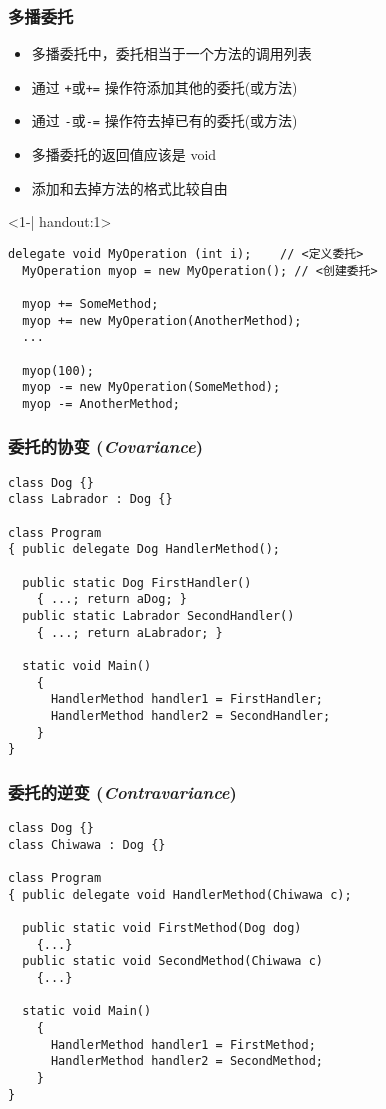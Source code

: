 \begin{frame}[fragile]
\frametitle{多播委托}
\begin{itemize}
\setlength{\itemsep}{4pt plus 1pt}
\item<1-| handout:1> 多播委托中，委托相当于一个方法的调用列表
\item<2-| handout:1> 通过 \texttt{+}或\texttt{+=} 操作符添加其他的委托(或方法)
\item<2-| handout:1> 通过 \texttt{-}或\texttt{-=} 操作符去掉已有的委托(或方法)
\item<3-| handout:1> 多播委托的返回值应该是 void
\item<3-| handout:1> 添加和去掉方法的格式比较自由
\end{itemize}
\begin{onlyenv}<1-| handout:1>
\begin{lstlisting}[escapeinside=<>]
  delegate void MyOperation (int i);    // <定义委托>
  MyOperation myop = new MyOperation(); // <创建委托>

  myop += SomeMethod;
  myop += new MyOperation(AnotherMethod);
  ...

  myop(100);
  myop -= new MyOperation(SomeMethod);
  myop -= AnotherMethod;

\end{lstlisting}
\end{onlyenv}
\end{frame}

\begin{frame}[fragile]
\frametitle{委托的协变 (\textit{Covariance})}
\begin{lstlisting}
class Dog {}
class Labrador : Dog {}

class Program
{ public delegate Dog HandlerMethod();

  public static Dog FirstHandler()  
    { ...; return aDog; }
  public static Labrador SecondHandler()
    { ...; return aLabrador; }

  static void Main() 
    {
      HandlerMethod handler1 = FirstHandler;
      HandlerMethod handler2 = SecondHandler;
    }
}
\end{lstlisting}
\end{frame}

\begin{frame}[fragile]
\frametitle{委托的逆变 (\textit{Contravariance})}
\begin{lstlisting}
class Dog {}
class Chiwawa : Dog {}
 
class Program
{ public delegate void HandlerMethod(Chiwawa c);
 
  public static void FirstMethod(Dog dog)
    {...}
  public static void SecondMethod(Chiwawa c)
    {...}
 
  static void Main()
    {
      HandlerMethod handler1 = FirstMethod;
      HandlerMethod handler2 = SecondMethod;
    }
}
\end{lstlisting}
\end{frame}


